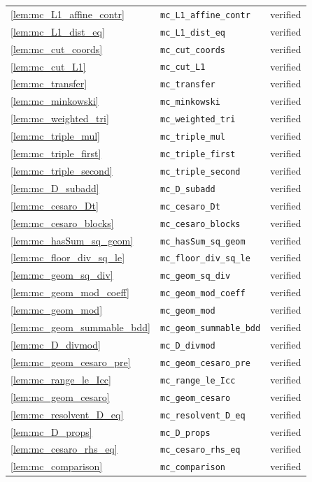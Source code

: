 \documentclass[11pt]{article}
\theoremstyle{definition}
\theoremstyle{remark}
\begin{document}
\begin{longtable}{@{}lll@{}}
\cref{lem:mc_L1_affine_contr} & \texttt{mc\_L1\_affine\_contr} & verified \\
\cref{lem:mc_L1_dist_eq} & \texttt{mc\_L1\_dist\_eq} & verified \\
\cref{lem:mc_cut_coords} & \texttt{mc\_cut\_coords} & verified \\
\cref{lem:mc_cut_L1} & \texttt{mc\_cut\_L1} & verified \\
\cref{lem:mc_transfer} & \texttt{mc\_transfer} & verified \\
\cref{lem:mc_minkowski} & \texttt{mc\_minkowski} & verified \\
\cref{lem:mc_weighted_tri} & \texttt{mc\_weighted\_tri} & verified \\
\cref{lem:mc_triple_mul} & \texttt{mc\_triple\_mul} & verified \\
\cref{lem:mc_triple_first} & \texttt{mc\_triple\_first} & verified \\
\cref{lem:mc_triple_second} & \texttt{mc\_triple\_second} & verified \\
\cref{lem:mc_D_subadd} & \texttt{mc\_D\_subadd} & verified \\
\cref{lem:mc_cesaro_Dt} & \texttt{mc\_cesaro\_Dt} & verified \\
\cref{lem:mc_cesaro_blocks} & \texttt{mc\_cesaro\_blocks} & verified \\
\cref{lem:mc_hasSum_sq_geom} & \texttt{mc\_hasSum\_sq\_geom} & verified \\
\cref{lem:mc_floor_div_sq_le} & \texttt{mc\_floor\_div\_sq\_le} & verified \\
\cref{lem:mc_geom_sq_div} & \texttt{mc\_geom\_sq\_div} & verified \\
\cref{lem:mc_geom_mod_coeff} & \texttt{mc\_geom\_mod\_coeff} & verified \\
\cref{lem:mc_geom_mod} & \texttt{mc\_geom\_mod} & verified \\
\cref{lem:mc_geom_summable_bdd} & \texttt{mc\_geom\_summable\_bdd} & verified \\
\cref{lem:mc_D_divmod} & \texttt{mc\_D\_divmod} & verified \\
\cref{lem:mc_geom_cesaro_pre} & \texttt{mc\_geom\_cesaro\_pre} & verified \\
\cref{lem:mc_range_le_Icc} & \texttt{mc\_range\_le\_Icc} & verified \\
\cref{lem:mc_geom_cesaro} & \texttt{mc\_geom\_cesaro} & verified \\
\cref{lem:mc_resolvent_D_eq} & \texttt{mc\_resolvent\_D\_eq} & verified \\
\cref{lem:mc_D_props} & \texttt{mc\_D\_props} & verified \\
\cref{lem:mc_cesaro_rhs_eq} & \texttt{mc\_cesaro\_rhs\_eq} & verified \\
\cref{lem:mc_comparison} & \texttt{mc\_comparison} & verified \\
\bottomrule
\end{longtable}
\end{document}
